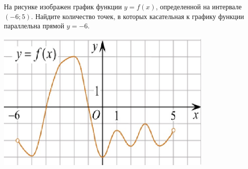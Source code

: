 \begin{listofex}
\begin{minipage}[t]{0.66\textwidth}
		На рисунке изображен график функции \(y=f(x)\), определенной на интервале \((-6; 5)\). Найдите количество точек, в которых касательная к графику функции параллельна прямой \(y=-6\).
	\end{minipage}
	\begin{minipage}[c]{0.3\textwidth}
		\includegraphics[align=t, width=0.8\textwidth]{pics/G111M3H2-4}
	\end{minipage}
\end{listofex}
%	
%	
%	
%	
%	
%	
